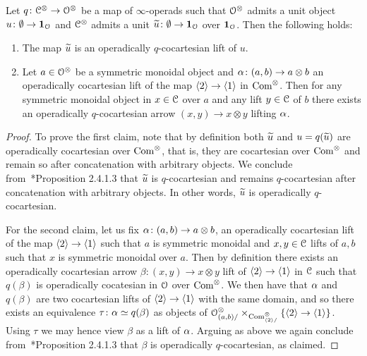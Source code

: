 \begin{lemma}
\label{lemma:absolute-is-relative}%
Let $q\colon \mathcal C^{\otimes} \to \mathcal{O}^{\otimes}$ be a map of $\infty$-operads such that $\mathcal{O}^{\otimes}$ admits a unit object $u\colon \emptyset \to \mathbf{1}_{\mathcal{O}}$ and $\mathcal C^{\otimes}$ admits a unit $\widetilde{u}\colon \emptyset \to \mathbf{1}_{\mathcal{O}}$
over $\mathbf{1}_{\mathcal{O}}$. Then the following holds:
\begin{enumerate}
\item
The map $\widetilde{u}$
is an operadically $q$-cocartesian lift of $u$.
\item
Let $a \in \mathcal{O}^{\otimes}$ be a symmetric monoidal object and $\alpha\colon (a,b) \to a\otimes b$ an operadically cocartesian lift of the map $\langle2\rangle \to \langle1\rangle$ in $\mathrm{Com}^{\otimes}$. Then for any symmetric monoidal object in $x \in \mathcal C$ over $a$ and any lift $y \in \mathcal C$ of $b$ there exists an operadically $q$-cocartesian arrow $(x,y) \to x\otimes y$ lifting $\alpha$.
\end{enumerate}
\end{lemma}
\begin{proof}
To prove the first claim, note that by definition both $\widetilde{u}$ and $u=q(\widetilde{u})$ are operadically cocartesian over $\mathrm{Com}^{\otimes}$, that is, they are cocartesian over $\mathrm{Com}^{\otimes}$ and remain so after concatenation with arbitrary objects. 
We conclude from~\cite{HTT}*{Proposition 2.4.1.3} that $\widetilde{u}$ is $q$-cocartesian and remains $q$-cocartesian after concatenation with arbitrary objects. In other words, $\widetilde{u}$ is operadically $q$-cocartesian.

For the second claim, let us fix $\alpha\colon (a,b) \to a\otimes b$, an operadically cocartesian lift of the map $\langle2\rangle \to \langle1\rangle$ such that $a$ is symmetric monoidal and $x,y \in \mathcal C$ lifts of $a,b$ such that $x$ is symmetric monoidal over $a$. Then by definition there exists an operadically cocartesian arrow $\beta\colon (x,y) \to x\otimes y$ lift of $\langle2\rangle \to \langle1\rangle$ in $\mathcal C$ such that $q(\beta)$ is operadically cocatesian in $\mathcal{O}$ over $\mathrm{Com}^{\otimes}$. We then have that $\alpha$ and $q(\beta)$ are two cocartesian lifts of $\langle2\rangle \to \langle1\rangle$ with the same domain, and so there exists an equivalence $\tau\colon \alpha\simeq q(\beta)$ as objects of $\mathcal{O}^{\otimes}_{(a,b)/} \times_{\mathrm{Com}^{\otimes}_{\langle2\rangle/}} \{\langle2\rangle\to \langle1\rangle\}$. Using $\tau$ we may hence view $\beta$ as a lift of $\alpha$. Arguing as above we again conclude from~\cite{HTT}*{Proposition 2.4.1.3} that $\beta$ is operadically $q$-cocartesian, as claimed.
\end{proof}




